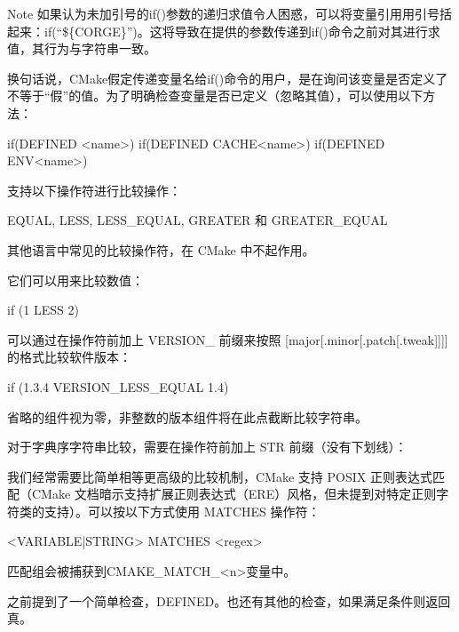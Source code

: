 \begin{myNotic}{Note}
如果认为未加引号的if()参数的递归求值令人困惑，可以将变量引用用引号括起来：if(“\$\{CORGE\}”)。这将导致在提供的参数传递到if()命令之前对其进行求值，其行为与字符串一致。
\end{myNotic}

换句话说，CMake假定传递变量名给if()命令的用户，是在询问该变量是否定义了不等于“假”的值。为了明确检查变量是否已定义（忽略其值），可以使用以下方法：

\begin{cmake}
if(DEFINED <name>)
if(DEFINED CACHE{<name>})
if(DEFINED ENV{<name>})
\end{cmake}


支持以下操作符进行比较操作：

EQUAL, LESS, LESS\_EQUAL, GREATER 和 GREATER\_EQUAL

其他语言中常见的比较操作符，在 CMake 中不起作用。

它们可以用来比较数值：

\begin{cmake}
if (1 LESS 2)
\end{cmake}

可以通过在操作符前加上 VERSION\_ 前缀来按照 [major[.minor[.patch[.tweak]]]] 的格式比较软件版本：

\begin{cmake}
if (1.3.4 VERSION_LESS_EQUAL 1.4)
\end{cmake}

省略的组件视为零，非整数的版本组件将在此点截断比较字符串。

对于字典序字符串比较，需要在操作符前加上 STR 前缀（没有下划线）：


我们经常需要比简单相等更高级的比较机制，CMake 支持 POSIX 正则表达式匹配（CMake 文档暗示支持扩展正则表达式（ERE）风格，但未提到对特定正则字符类的支持）。可以按以下方式使用 MATCHES 操作符：

\begin{shell}
<VARIABLE|STRING> MATCHES <regex>
\end{shell}

匹配组会被捕获到CMAKE\_MATCH\_<n>变量中。


之前提到了一个简单检查，DEFINED。也还有其他的检查，如果满足条件则返回真。

